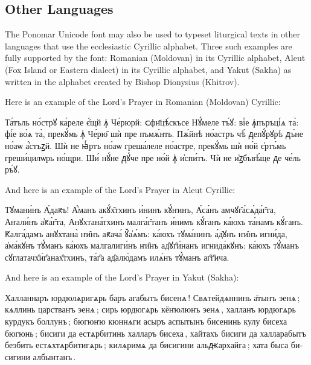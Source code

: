 \subsection{Other Languages}
The Ponomar Unicode font may also be used to typeset liturgical texts in other languages that use the ecclesiastic Cyrillic alphabet. Three such examples
are fully supported by the font: Romanian (Moldovan) in its Cyrillic alphabet, Aleut (Fox Island or Eastern dialect) in its Cyrillic alphabet, and Yakut (Sakha) as written in the alphabet created by Bishop Dionysius (Khitrov).

Here is an example of the Lord's Prayer in Romanian (Moldovan) Cyrillic: \\

\begin{russian}
{\glyphfont \large 
Та́тъль но́стрꙋ ка́реле є҆́щй ꙟ҆ Че́рюрй: ᲃ︀фн҃цѣ́скъсе Нꙋ́меле тъ́ꙋ: ві́е ꙟ҆пъръці́ѧ та̀: фі́е во́ѧ та̀, прекꙋ́мь ꙟ҆ Че́рю̆ шѝ пре пъмѫ́нть. Пѫ́йнѣ но́астръ чѣ̀ ᲁепꙋ́рꙋрѣ ᲁъ́не но́аѡ а҆́стъꙁй. Шѝ не ꙗ҆́ртъ но́аѡ греша́леле но́астре, прекꙋ́мь шѝ но́й є҆ртъ́мь греши́цилѡрь но́щри. Ши́ нꙋ́не ᲁꙋ́че пре но́й ꙟ҆ и҆спи́тъ. Чѝ не и҆ꙁбъвѣ́ще ᲁе че́ль ръ́ꙋ. 
} \\
\end{russian}

And here is an example of the Lord's Prayer in Aleut Cyrillic: \\

\begin{russian}
{\glyphfont \large
Тꙋмани́нъ А́даԟъ! А҆́манъ акꙋ́х̑тхинъ и́нинъ кꙋ́ҥинъ, А́са́нъ амчꙋг̑а́сѧ́да́г̑та, Аҥали́нъ а҆ԟа́г̑та, Анꙋхтана́тхинъ малга́г̑танъ и́нимъ кꙋ́ганъ ка́юхъ та́намъ кꙋ́ганъ. Ԟалга́дамъ анꙋхтана̀ ҥи̑нъ аԟача́ ꙋ̆а҆ѧ́мъ: ка́юхъ тꙋма́нинъ а́д̑ꙋнъ ҥи̑нъ игни́да, а҆ма́кꙋнъ тꙋ́манъ ка́юхъ малгалиги́нъ ҥи̑нъ ад̑ꙋг̑и́нанъ игнида́кꙋнъ: ка́юхъ тꙋ́манъ сꙋглатачх̑и́г̑анах̑тхинъ, та́г̑а ад̑алю́дамъ илѧ́нъ тꙋ́манъ аг̑г̑ича.
} \\
\end{russian}

And here is an example of the Lord's Prayer in Yakut (Sakha): \\

\begin{russian}
{\glyphfont \large
Халланнаръ юрдюлѧригѧрь баръ агабытъ бисенѧ ! Свѧтейдѧннинь а̄тыҥъ эенѧ ; кѧллинь царстваҥъ эенѧ ; сирь юрдюгѧрь кёҥюлюҥь эенѧ , халланъ юрдюгѧрь курдукъ боллунъ ; бюгюҥю кюннѧги асыръ аспытынъ бисенинь кулу бисеха бюгюнь ; бисиги да естѧрбитинь халларъ бисеха , хайтахъ бисиги да халларабытъ беэбить естѧхтѧрбитигѧрь ; килѧримѧ да бисигини альԫархайга ; хата быса бисигини албынтанъ .
}
\end{russian}

